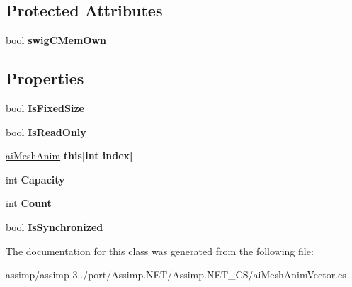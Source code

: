 \subsection*{Protected Attributes}
\begin{DoxyCompactItemize}
\item 
\hypertarget{classai_mesh_anim_vector_aa7c1594fb004e5b42567f0394d8a376d}{bool {\bfseries swig\+C\+Mem\+Own}}\label{classai_mesh_anim_vector_aa7c1594fb004e5b42567f0394d8a376d}

\end{DoxyCompactItemize}
\subsection*{Properties}
\begin{DoxyCompactItemize}
\item 
\hypertarget{classai_mesh_anim_vector_ac85c0b395be5678400cb8931c8c722e2}{bool {\bfseries Is\+Fixed\+Size}}\label{classai_mesh_anim_vector_ac85c0b395be5678400cb8931c8c722e2}

\item 
\hypertarget{classai_mesh_anim_vector_a59a478ed74aace999df1521c35fb02db}{bool {\bfseries Is\+Read\+Only}}\label{classai_mesh_anim_vector_a59a478ed74aace999df1521c35fb02db}

\item 
\hypertarget{classai_mesh_anim_vector_ac34b36c5b479d956aef36329bea9a348}{\hyperlink{structai_mesh_anim}{ai\+Mesh\+Anim} {\bfseries this\mbox{[}int index\mbox{]}}}\label{classai_mesh_anim_vector_ac34b36c5b479d956aef36329bea9a348}

\item 
\hypertarget{classai_mesh_anim_vector_af0381e6e159e357ab7c9bea32dd21818}{int {\bfseries Capacity}}\label{classai_mesh_anim_vector_af0381e6e159e357ab7c9bea32dd21818}

\item 
\hypertarget{classai_mesh_anim_vector_af0df76b0790fad351329a969b02fa33a}{int {\bfseries Count}}\label{classai_mesh_anim_vector_af0df76b0790fad351329a969b02fa33a}

\item 
\hypertarget{classai_mesh_anim_vector_ae7d50cb295ff5abf5eb6d0c6fd3d342f}{bool {\bfseries Is\+Synchronized}}\label{classai_mesh_anim_vector_ae7d50cb295ff5abf5eb6d0c6fd3d342f}

\end{DoxyCompactItemize}


The documentation for this class was generated from the following file\+:\begin{DoxyCompactItemize}
\item 
assimp/assimp-\/3../port/\+Assimp.\+N\+E\+T/\+Assimp.\+N\+E\+T\+\_\+\+C\+S/ai\+Mesh\+Anim\+Vector.\+cs\end{DoxyCompactItemize}
